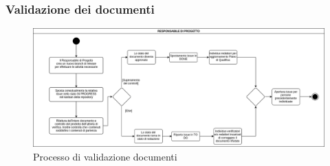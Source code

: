 \subsubsection{Validazione dei documenti}
\begin{figure}[h!]
    \includegraphics[width=\linewidth]{res/images/processo_validazione.png}
    \caption{Processo di validazione documenti}
\end{figure}




